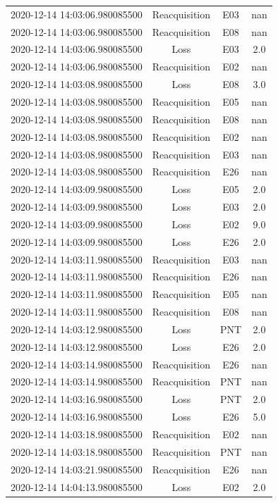 \begin{enumerate}
\begin{longtabu}{cccc}
2020{-}12{-}14 14:03:06.980085500&Reacquisition&E03&nan\\%
2020{-}12{-}14 14:03:06.980085500&Reacquisition&E08&nan\\%
2020{-}12{-}14 14:03:06.980085500&Loss&E03&2.0\\%
2020{-}12{-}14 14:03:06.980085500&Reacquisition&E02&nan\\%
2020{-}12{-}14 14:03:08.980085500&Loss&E08&3.0\\%
2020{-}12{-}14 14:03:08.980085500&Reacquisition&E05&nan\\%
2020{-}12{-}14 14:03:08.980085500&Reacquisition&E08&nan\\%
2020{-}12{-}14 14:03:08.980085500&Reacquisition&E02&nan\\%
2020{-}12{-}14 14:03:08.980085500&Reacquisition&E03&nan\\%
2020{-}12{-}14 14:03:08.980085500&Reacquisition&E26&nan\\%
2020{-}12{-}14 14:03:09.980085500&Loss&E05&2.0\\%
2020{-}12{-}14 14:03:09.980085500&Loss&E03&2.0\\%
2020{-}12{-}14 14:03:09.980085500&Loss&E02&9.0\\%
2020{-}12{-}14 14:03:09.980085500&Loss&E26&2.0\\%
2020{-}12{-}14 14:03:11.980085500&Reacquisition&E03&nan\\%
2020{-}12{-}14 14:03:11.980085500&Reacquisition&E26&nan\\%
2020{-}12{-}14 14:03:11.980085500&Reacquisition&E05&nan\\%
2020{-}12{-}14 14:03:11.980085500&Reacquisition&E08&nan\\%
2020{-}12{-}14 14:03:12.980085500&Loss&PNT&2.0\\%
2020{-}12{-}14 14:03:12.980085500&Loss&E26&2.0\\%
2020{-}12{-}14 14:03:14.980085500&Reacquisition&E26&nan\\%
2020{-}12{-}14 14:03:14.980085500&Reacquisition&PNT&nan\\%
2020{-}12{-}14 14:03:16.980085500&Loss&PNT&2.0\\%
2020{-}12{-}14 14:03:16.980085500&Loss&E26&5.0\\%
2020{-}12{-}14 14:03:18.980085500&Reacquisition&E02&nan\\%
2020{-}12{-}14 14:03:18.980085500&Reacquisition&PNT&nan\\%
2020{-}12{-}14 14:03:21.980085500&Reacquisition&E26&nan\\%
2020{-}12{-}14 14:04:13.980085500&Loss&E02&2.0\\%

\end{longtabu}
\end{enumerate}
